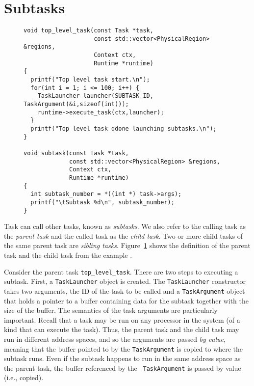 \section{Subtasks}
\label{sec:subtasks}


\begin{figure}
\begin{lstlisting}
void top_level_task(const Task *task,
                    const std::vector<PhysicalRegion> &regions,
                    Context ctx, 
                    Runtime *runtime)
{
  printf("Top level task start.\n");
  for(int i = 1; i <= 100; i++) {
    TaskLauncher launcher(SUBTASK_ID, TaskArgument(&i,sizeof(int)));
    runtime->execute_task(ctx,launcher);
  }
  printf("Top level task ddone launching subtasks.\n");
}

void subtask(const Task *task,
             const std::vector<PhysicalRegion> &regions,
             Context ctx,
             Runtime *runtime)
{
  int subtask_number = *((int *) task->args);
  printf("\tSubtask %d\n", subtask_number);
}
\end{lstlisting}
\caption{}
\label{fig:subtask}
\end{figure}



Task can call other tasks, known as {\em subtasks}.  We also refer to
the calling task as the {\em parent task} and the called task as the
{\em child task}.  Two or more child tasks of the same parent task are
{\em sibling tasks}.  Figure~\ref{fig:subtask} shows the definition of
the parent task and the child task from the example
.

Consider the parent task {\tt top\_level\_task}.  There are two steps
to executing a subtask.  First, a {\tt TaskLauncher} object is
created.  The {\tt TaskLauncher}
constructor takes two arguments, the ID of the task to be called and a
{\tt TaskArgument} object that holds a pointer to a buffer containing
data for the subtask together with the size of the buffer.  The
semantics of the task arguments are particularly important.  Recall
that a task may be run on any processor in the system (of a kind that
can execute the task).  Thus, the parent task and the child task may
run in different address spaces, and so the arguments are passed
{\em by value}, meaning that the buffer pointed to by the {\tt TaskArgument} is
copied to where the subtask runs.  Even if the subtask happens to run in the
same address space as the parent task, the buffer referenced by the {\tt
  TaskArgument} is passed by value (i.e., copied).  

